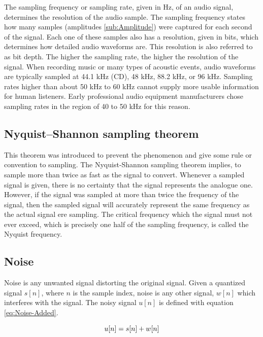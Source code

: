 The sampling frequency or sampling rate, given in \gls{Hz}, of an audio signal, determines the resolution of the audio sample. The sampling frequency states how many samples (amplitudes \ref{sub:Amplitude}) were captured for each second of the signal. Each one of these samples also has a resolution, given in bits, which determines how detailed audio waveforms are. This resolution is also referred to as bit depth. The higher the sampling rate, the higher the resolution of the signal. When recording music or many types of acoustic events, audio waveforms are typically sampled at 44.1 \gls{kHz} (CD), 48 \gls{kHz}, 88.2 \gls{kHz}, or 96 \gls{kHz}. Sampling rates higher than about 50 \gls{kHz} to 60 \gls{kHz} cannot supply more usable information for human listeners. Early professional audio equipment manufacturers chose sampling rates in the region of 40 to 50 \gls{kHz} for this reason.

\subsection{Nyquist–Shannon sampling theorem}
\label{sub:Nyquist–Shannon}

This theorem was introduced to prevent the  phenomenon and give some rule or convention to sampling. The Nyquist-Shannon sampling theorem implies, to sample more than twice as fast as the signal to convert.
\newline
\newline
Whenever a sampled signal is given, there is no certainty that the signal represents the analogue one. However, if the signal was sampled at more than twice the frequency of the signal, then the sampled signal will accurately represent the same frequency as the actual signal ere sampling. The critical frequency which the signal must not ever exceed, which is precisely one half of the sampling frequency, is called the Nyquist frequency.

\subsection{Noise}
\label{sub:Noise}

Noise is any unwanted signal distorting the original signal. Given a quantized signal $s[n]$, where $n$ is the sample index, noise is any other signal, $w[n]$ which interferes with the signal. The noisy signal $u[n]$ is defined with equation \ref{eq:Noise-Added}.

\begin{equation}
    \centering
    u[n] = s[n] + w[n]
    \label{eq:Noise-Added}
\end{equation}

